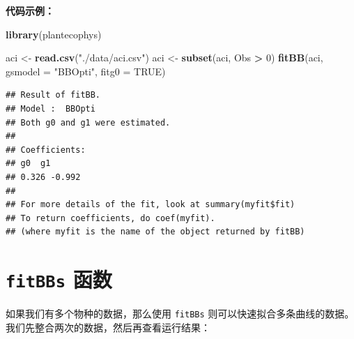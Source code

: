 \documentclass[]{krantz}
\makeatletter
\newenvironment{Shaded}{\begin{snugshade}}{\end{snugshade}}
\newcommand{\KeywordTok}[1]{\textcolor[rgb]{0.13,0.29,0.53}{\textbf{#1}}}
\newcommand{\DataTypeTok}[1]{\textcolor[rgb]{0.13,0.29,0.53}{#1}}
\newcommand{\DecValTok}[1]{\textcolor[rgb]{0.00,0.00,0.81}{#1}}
\newcommand{\StringTok}[1]{\textcolor[rgb]{0.31,0.60,0.02}{#1}}
\newcommand{\OtherTok}[1]{\textcolor[rgb]{0.56,0.35,0.01}{#1}}
\newcommand{\OperatorTok}[1]{\textcolor[rgb]{0.81,0.36,0.00}{\textbf{#1}}}
\newcommand{\NormalTok}[1]{#1}
\newenvironment{kframe}{%
\medskip{}
\setlength{\fboxsep}{.8em}
 \def\at@end@of@kframe{}%
 \ifinner\ifhmode%
  \def\at@end@of@kframe{\end{minipage}}%
  \begin{minipage}{\columnwidth}%
 \fi\fi%
 \def\FrameCommand##1{\hskip\@totalleftmargin \hskip-\fboxsep
 \colorbox{shadecolor}{##1}\hskip-\fboxsep
     \hskip-\linewidth \hskip-\@totalleftmargin \hskip\columnwidth}%
 \MakeFramed {\advance\hsize-\width
   \@totalleftmargin\z@ \linewidth\hsize
   \@setminipage}}%
 {\par\unskip\endMakeFramed%
 \at@end@of@kframe}
\renewenvironment{Shaded}{\begin{kframe}}{\end{kframe}}
\theoremstyle{definition}
\theoremstyle{definition}
\theoremstyle{definition}
\theoremstyle{remark}
\makeatother
\begin{document}
\textbf{代码示例：}

\begin{Shaded}
\begin{Highlighting}[]
\KeywordTok{library}\NormalTok{(plantecophys)}

\NormalTok{aci <-}\StringTok{ }\KeywordTok{read.csv}\NormalTok{(}\StringTok{"./data/aci.csv"}\NormalTok{)}
\NormalTok{aci <-}\StringTok{ }\KeywordTok{subset}\NormalTok{(aci, Obs }\OperatorTok{>}\StringTok{ }\DecValTok{0}\NormalTok{)}
\KeywordTok{fitBB}\NormalTok{(aci, }\DataTypeTok{gsmodel =} \StringTok{"BBOpti"}\NormalTok{, }\DataTypeTok{fitg0 =} \OtherTok{TRUE}\NormalTok{)}
\end{Highlighting}
\end{Shaded}

\begin{verbatim}
## Result of fitBB.
## Model :  BBOpti 
## Both g0 and g1 were estimated.
## 
## Coefficients:
## g0  g1
## 0.326 -0.992 
## 
## For more details of the fit, look at summary(myfit$fit)
## To return coefficients, do coef(myfit).
## (where myfit is the name of the object returned by fitBB)
\end{verbatim}

\section{\texorpdfstring{\texttt{fitBBs}
函数}{fitBBs 函数}}\label{fitbbs-}

如果我们有多个物种的数据，那么使用 \texttt{fitBBs}
则可以快速拟合多条曲线的数据。我们先整合两次的数据，然后再查看运行结果：
\end{document}
